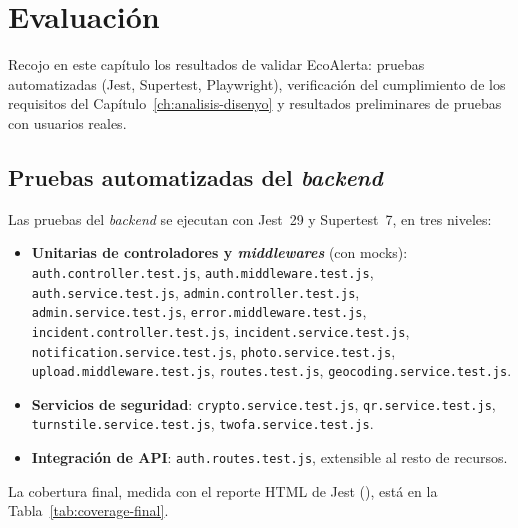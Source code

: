 \chapter{Evaluación}
\label{ch:evaluacion}

Recojo en este capítulo los resultados de validar EcoAlerta: pruebas automatizadas (Jest, Supertest, Playwright), verificación del cumplimiento de los requisitos del Capítulo~\ref{ch:analisis-disenyo} y resultados preliminares de pruebas con usuarios reales.


\section{Pruebas automatizadas del \textit{backend}}
\label{sec:tests-backend}

Las pruebas del \textit{backend} se ejecutan con Jest~29 y Supertest~7, en tres niveles:

\begin{itemize}[leftmargin=1.2cm, itemsep=2pt]
  \item \textbf{Unitarias de controladores y \textit{middlewares}} (con mocks): \texttt{auth.controller.test.js}, \texttt{auth.middleware.test.js}, \texttt{auth.service.test.js}, \texttt{admin.controller.test.js}, \texttt{admin.service.test.js}, \texttt{error.middleware.test.js}, \texttt{incident.controller.test.js}, \texttt{incident.service.test.js}, \texttt{notification.service.test.js}, \texttt{photo.service.test.js}, \texttt{upload.middleware.test.js}, \texttt{routes.test.js}, \texttt{geocoding.service.test.js}.
  \item \textbf{Servicios de seguridad}: \texttt{crypto.service.test.js}, \texttt{qr.service.test.js}, \texttt{turnstile.service.test.js}, \texttt{twofa.service.test.js}.
  \item \textbf{Integración de API}: \texttt{auth.routes.test.js}, extensible al resto de recursos.
\end{itemize}

La cobertura final, medida con el reporte HTML de Jest (), está en la Tabla~\ref{tab:coverage-final}.

